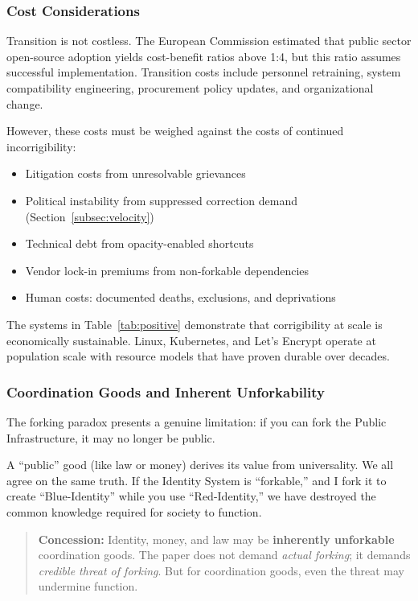 \documentclass{article}
\begin{document}
\subsubsection{Cost Considerations}

Transition is not costless. The European Commission \citep{eu2021oss} estimated that public sector open-source adoption yields cost-benefit ratios above 1:4, but this ratio assumes successful implementation. Transition costs include personnel retraining, system compatibility engineering, procurement policy updates, and organizational change.

However, these costs must be weighed against the costs of continued incorrigibility:

\begin{itemize}
    \item Litigation costs from unresolvable grievances
    \item Political instability from suppressed correction demand (Section~\ref{subsec:velocity})
    \item Technical debt from opacity-enabled shortcuts
    \item Vendor lock-in premiums from non-forkable dependencies
    \item Human costs: documented deaths, exclusions, and deprivations
\end{itemize}

The systems in Table~\ref{tab:positive} demonstrate that corrigibility at scale is economically sustainable. Linux, Kubernetes, and Let's Encrypt operate at population scale with resource models that have proven durable over decades.

\subsubsection{Coordination Goods and Inherent Unforkability}
\label{subsec:coordination}

The forking paradox presents a genuine limitation: if you can fork the Public Infrastructure, it may no longer be public.

A ``public'' good (like law or money) derives its value from universality. We all agree on the same truth. If the Identity System is ``forkable,'' and I fork it to create ``Blue-Identity'' while you use ``Red-Identity,'' we have destroyed the common knowledge required for society to function.

\begin{quote}
\textbf{Concession:} Identity, money, and law may be \textbf{inherently unforkable} coordination goods. The paper does not demand \textit{actual forking}; it demands \textit{credible threat of forking}. But for coordination goods, even the threat may undermine function.
\end{quote}
\end{document}
